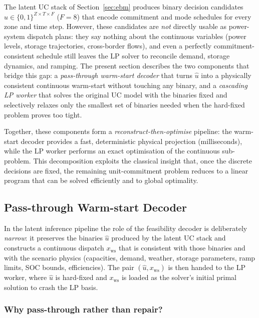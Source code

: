 \documentclass{article}
\begin{document}
The latent UC stack of Section~\ref{sec:ebm} produces binary decision candidates $\hat{u} \in \{0,1\}^{Z \times T \times F}$ ($F{=}8$) that encode commitment and mode schedules for every zone and time step. However, these candidates are \emph{not} directly usable as power-system dispatch plans: they say nothing about the continuous variables (power levels, storage trajectories, cross-border flows), and even a perfectly commitment-consistent schedule still leaves the LP solver to reconcile demand, storage dynamics, and ramping. The present section describes the two components that bridge this gap: a \emph{pass-through warm-start decoder} that turns $\hat{u}$ into a physically consistent continuous warm-start without touching any binary, and a \emph{cascading LP worker} that solves the original UC model with the binaries fixed and selectively relaxes only the smallest set of binaries needed when the hard-fixed problem proves too tight.

Together, these components form a \emph{reconstruct-then-optimise} pipeline: the warm-start decoder provides a fast, deterministic physical projection (milliseconds), while the LP worker performs an exact optimisation of the continuous sub-problem. This decomposition exploits the classical insight that, once the discrete decisions are fixed, the remaining unit-commitment problem reduces to a linear program that can be solved efficiently and to global optimality.


\subsection{Pass-through Warm-start Decoder}
\label{sec:feasibility_decoder}

In the latent inference pipeline the role of the feasibility decoder is deliberately \emph{narrow}: it preserves the binaries $\hat{u}$ produced by the latent UC stack and constructs a continuous dispatch $x_{\mathrm{ws}}$ that is consistent with those binaries and with the scenario physics (capacities, demand, weather, storage parameters, ramp limits, SOC bounds, efficiencies). The pair $(\hat{u}, x_{\mathrm{ws}})$ is then handed to the LP worker, where $\hat{u}$ is hard-fixed and $x_{\mathrm{ws}}$ is loaded as the solver's initial primal solution to crash the LP basis.

\subsubsection{Why pass-through rather than repair?}
\end{document}
